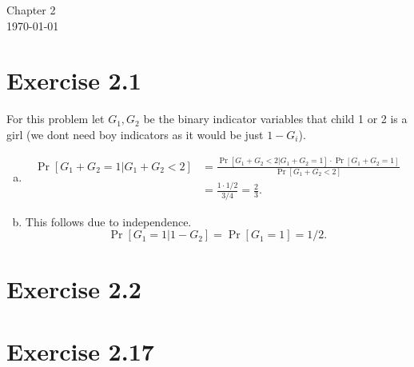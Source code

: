 \documentclass[12pt]{article}
\newcommand{\bayes}[2]{\frac{\Pr[#1|#2] \cdot \Pr[#2]}{\Pr[#1]}}
\begin{document}
\begin{center}
{\Large Chapter 2}\\
\today
\end{center}
\section*{Exercise 2.1}
For this problem let $G_1, G_2$ be the binary indicator variables that child 1 or 2
is a girl (we dont need boy indicators as it would be just $1 - G_i$).
\begin{enumerate}[a)]
    \item
        \begin{align*}
            \Pr[G_1 + G_2 = 1| G_1 + G_2 < 2] &= \bayes{G_1 + G_2 < 2}{G_1 + G_2 = 1}\\
            &= \frac{1 \cdot 1/2}{3/4} = \frac{2}{3}.
        \end{align*}
    \item
        This follows due to independence.
        \[\Pr[G_1 = 1|1 - G_2] = \Pr[G_1 = 1] = 1/2.\]
\end{enumerate}
\section*{Exercise 2.2}
\section*{Exercise 2.17}
\end{document}
